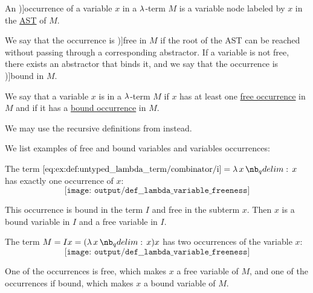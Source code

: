 \begin{definition}\label{def:lambda_variable_occurrence}\mimprovised
  An \term[ru=вхождение (\cite[64]{Герасимов2011})]{occurrence} of a variable \( x \) in a \( \mathrm{\lambda} \)-term \( M \) is a variable node labeled by \( x \) in the \hyperref[def:untyped_lambda_term_ast]{AST} of \( M \).

  We say that the occurrence is \term[ru=свободное (вхождение) (\cite[64]{Герасимов2011})]{free} in \( M \) if the root of the AST can be reached without passing through a corresponding abstractor. If a variable is not free, there exists an abstractor that binds it, and we say that the occurrence is \term[ru=связанное (вхождение) (\cite[64]{Герасимов2011})]{bound} in \( M \).
\end{definition}

\begin{definition}\label{def:lambda_variable_freeness}\mimprovised
  We say that a variable \( x \) is  in a \( \mathrm{\lambda} \)-term \( M \) if \( x \) has at least one \hyperref[def:lambda_variable_occurrence]{free occurrence} in \( M \) and  if it has a \hyperref[def:lambda_variable_occurrence]{bound occurrence} in \( M \).
\end{definition}
\begin{comments}
  \item We may use the recursive definitions from  instead.
\end{comments}

\begin{example}\label{ex:def:lambda_variable_freeness}
  We list examples of free and bound variables and variables occurrences:
  \begin{thmenum}
     The term \( \ref{eq:ex:def:untyped_lambda_term/combinator/i} = \qabs x x \) has exactly one occurrence of \( x \):
    \begin{equation*}
      \texttt{[image: output/def\_\_lambda\_variable\_freeness]}
    \end{equation*}

     This occurrence is bound in the term \( I \) and free in the subterm \( x \). Then \( x \) is a bound variable in \( I \) and a free variable in \( I \).

     The term \( M = I x = (\qabs x x) x \) has two occurrences of the variable \( x \):
    \begin{equation*}
      \texttt{[image: output/def\_\_lambda\_variable\_freeness]}
    \end{equation*}

    One of the occurrences is free, which makes \( x \) a free variable of \( M \), and one of the occurrences if bound, which makes \( x \) a bound variable of \( M \).
  \end{thmenum}
\end{example}

